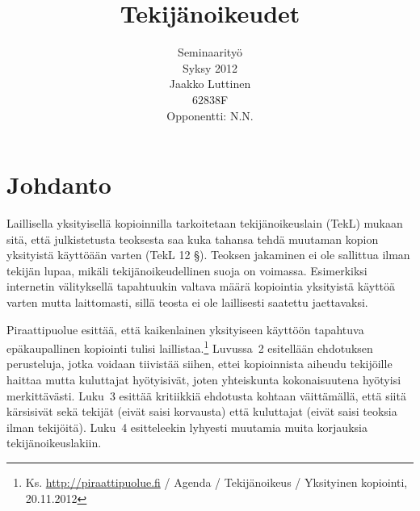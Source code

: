 \documentclass[titlepage,12pt]{article}
\title{Tekijänoikeudet}
\author{
  Seminaarityö\\
  \hfill Syksy 2012\\
  Jaakko Luttinen\\
  $62838$F\\
  Opponentti: N.N.
}
\date{ }
\begin{document}
\renewcommand\refname{Lähteet}
\renewcommand\bibname{Lähteet}

\nocite{*}

\maketitle

\tableofcontents



\pagebreak


\section{Johdanto}


Laillisella yksityisellä kopioinnilla tarkoitetaan tekijänoikeuslain
(TekL) mukaan sitä, että julkistetusta teoksesta saa kuka tahansa
tehdä muutaman kopion yksityistä käyttöään varten (TekL 12 §). Teoksen
jakaminen ei ole sallittua ilman tekijän lupaa, mikäli
tekijänoikeudellinen suoja on voimassa.  Esimerkiksi internetin
välityksellä tapahtuukin valtava määrä kopiointia yksityistä käyttöä
varten mutta laittomasti, sillä teosta ei ole laillisesti saatettu
jaettavaksi.



Piraattipuolue esittää, että kaikenlainen yksityiseen käyttöön
tapahtuva epäkaupallinen kopiointi tulisi
laillistaa.\footnote{Ks. \url{http://piraattipuolue.fi} / Agenda /
  Tekijänoikeus / Yksityinen kopiointi, 20.11.2012} Luvussa~2
esitellään ehdotuksen perusteluja, jotka voidaan tiivistää siihen,
ettei kopioinnista aiheudu tekijöille haittaa mutta kuluttajat
hyötyisivät, joten yhteiskunta kokonaisuutena hyötyisi merkittävästi.
Luku~3 esittää kritiikkiä ehdotusta kohtaan väittämällä, että siitä
kärsisivät sekä tekijät (eivät saisi korvausta) että kuluttajat (eivät
saisi teoksia ilman tekijöitä).  Luku~4 esitteleekin lyhyesti muutamia
muita korjauksia tekijänoikeuslakiin.


\end{document}
